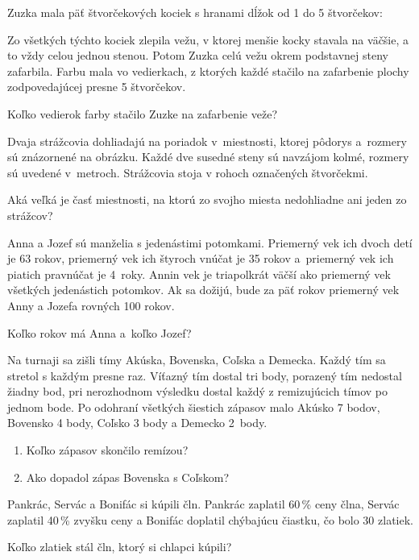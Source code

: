{%
Zuzka mala päť štvorčekových kociek s hranami dĺžok od 1 do 5 štvorčekov:
%

Zo všetkých týchto kociek zlepila vežu, v ktorej menšie kocky stavala na väčšie, a to vždy celou jednou stenou.
Potom Zuzka celú vežu okrem podstavnej steny zafarbila.
Farbu mala vo vedierkach, z ktorých každé stačilo na zafarbenie plochy zodpovedajúcej presne 5 štvorčekov.

Koľko vedierok farby stačilo Zuzke na zafarbenie veže?}

{%
Dvaja strážcovia dohliadajú na poriadok v~miestnosti, ktorej pôdorys a~rozmery sú znázornené na obrázku.
Každé dve susedné steny sú navzájom kolmé, rozmery sú uvedené v~metroch.
Strážcovia stoja v rohoch označených štvorčekmi.

Aká veľká je časť miestnosti, na ktorú zo svojho miesta nedohliadne ani jeden zo strážcov?
%
}

{%
Anna a Jozef sú manželia s jedenástimi potomkami.
Priemerný vek ich dvoch detí je 63 rokov,
priemerný vek ich štyroch vnúčat je 35 rokov
a~priemerný vek ich piatich pravnúčat je 4~roky.
Annin vek je triapolkrát väčší ako priemerný vek všetkých jedenástich potomkov.
Ak sa dožijú, bude za päť rokov priemerný vek Anny a Jozefa rovných 100 rokov.

Koľko rokov má Anna a~koľko Jozef?}

{%
Na turnaji sa zišli tímy Akúska, Bovenska, Coľska a Demecka.
Každý tím sa stretol s každým presne raz.
Víťazný tím dostal tri body, porazený tím nedostal žiadny bod, pri nerozhodnom výsledku dostal každý z remizujúcich tímov po jednom bode.
Po odohraní všetkých šiestich zápasov malo Akúsko 7 bodov, Bovensko 4 body, Coľsko 3 body a Demecko 2~body.
\begin{enumerate}\alphatrue
\item Koľko zápasov skončilo remízou?
\item Ako dopadol zápas Bovenska s Coľskom?
\end{enumerate}
}

{%
Pankrác, Servác a Bonifác si kúpili čln.
Pankrác zaplatil 60\,\% ceny člna, Servác zaplatil 40\,\% zvyšku ceny a Bonifác doplatil chýbajúcu čiastku, čo bolo 30 zlatiek.

Koľko zlatiek stál čln, ktorý si chlapci kúpili?}

